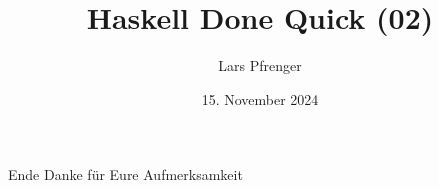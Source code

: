 \documentclass[
	aspectratio=169, 
	10pt 
]{beamer}
\title{Haskell Done Quick (02)}
\author{Lars Pfrenger}
\date{15. November 2024}
\begin{document}
\maketitle


\begin{frame}{Ende}
	\center Danke für Eure Aufmerksamkeit
\end{frame}
\end{document}
